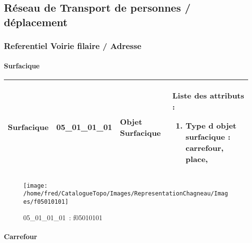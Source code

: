 \documentclass[12pt,titlepage]{book}
\begin{document}
\subsection{Réseau de Transport de personnes / déplacement}
\subsubsection{\large Referentiel Voirie filaire / Adresse}
\paragraph{Surfacique}
\noindent
\vspace{\baselineskip}

\renewcommand{\arraystretch}{1.2}
\begin{supertabular}{|p{10cm}|c|p{13cm}|p{12cm}|}
 Surfacique & 05\_01\_01\_01 & Objet Surfacique & Liste des attributs :
\begin{enumerate}
  \item Type d objet surfacique : carrefour, place,\end{enumerate}
\\
\hline
\end{supertabular}
\begin{figure}[h!]
  \hfill         %
  \begin{minipage}[t]{3cm}
    \begin{center}
      \texttt{[image: /home/fred/CatalogueTopo/Images/RepresentationChagneau/Images/f05010101]}
      \caption[~05\_01\_01\_01]{\small{05\_01\_01\_01~:} \tiny{f05010101}}\label{f05010101}
    \end{center}
  \end{minipage}
\end{figure}


\paragraph{Carrefour}
\noindent
\vspace{\baselineskip}
\end{document}
